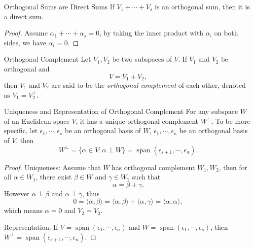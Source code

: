 \begin{proposition}{Orthogonal Sums are Direct Sums}{}
  If $V_1 + \cdots +V_s$ is an orthogonal sum,
  then it is a direct sum.
\end{proposition}

\begin{proof}
  Assume $\alpha_1 + \cdots + \alpha_s = 0$,
  by taking the inner product with $\alpha_i$ on both sides, we have $\alpha_i = 0$.
\end{proof}

\begin{definition}{Orthogonal Complement}{}
  Let $V_1, V_2$ be two subspaces of $V$.
  If $V_1$ and $V_2$ be orthogonal and
  \begin{equation}
    V = V_1 + V_2,
  \end{equation}
  then $V_1$ and $V_2$ are said to be the \emph{orthogonal complement} of each
  other,
  denoted as $V_1 = V_2^{\perp}$.
\end{definition}

\begin{proposition}{Uniqueness and Representation of Orthogonal Complement}{}
  For any subspace $W$ of an Euclidean space $V$,
  it has a unique orthogonal complement $W^{\perp}$.
  To be more specific,
  let $\epsilon_1,\cdots,\epsilon_s$ be an orthogonal basis of $W$,
  $\epsilon_1,\cdots,\epsilon_n$ be an orthogonal basis of $V$,
  then
  \begin{equation}
    W^{\perp} = \{\alpha \in V: \alpha \perp W\} = \operatorname{span}(\epsilon_{s+1},\cdots,\epsilon_n).
  \end{equation}
\end{proposition}

\begin{proof}
  Uniqueness: Assume that $W$ has orthogonal complement $W_1, W_2$,
  then for all $\alpha \in W_1$,
  there exist $\beta \in W$ and $\gamma \in W_2$ such that
  \begin{equation}
    \alpha = \beta + \gamma.
  \end{equation}
  However $\alpha \perp \beta$ and $\alpha \perp \gamma$,
  thus
  \begin{equation}
    0 = \langle \alpha, \beta \rangle = \langle \alpha, \beta \rangle
    + \langle \alpha, \gamma\rangle = \langle \alpha, \alpha \rangle,
  \end{equation}
  which means $\alpha = 0$ and $V_2 = V_3$.

  Representation: If $V = \operatorname{span}(\epsilon_1,\cdots,\epsilon_n)$ and
  $W = \operatorname{span}(\epsilon_1,\cdots,\epsilon_s)$,
  then $W^{\perp} = \operatorname{span}(\epsilon_{s+1},\cdots,\epsilon_n)$.
\end{proof}


